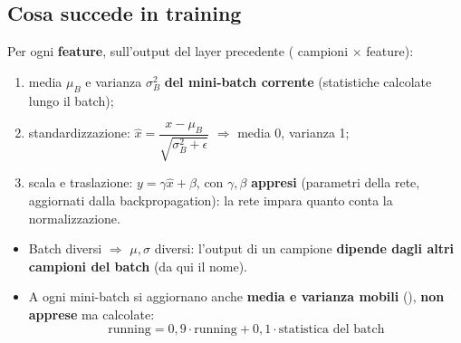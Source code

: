 \subsection{Cosa succede in training}
Per ogni \textbf{feature}, sull'output del layer precedente ( campioni $\times$  feature):
\begin{enumerate}
  \item media $\mu_B$ e varianza $\sigma^2_B$ \textbf{del mini-batch corrente} (statistiche calcolate lungo il batch);
  \item standardizzazione: $\hat x = \dfrac{x-\mu_B}{\sqrt{\sigma^2_B+\epsilon}}$ $\Rightarrow$ media 0, varianza 1;
  \item scala e traslazione: $y = \gamma\hat x + \beta$, con $\gamma, \beta$ \textbf{appresi} (parametri della rete, aggiornati dalla
        backpropagation): la rete impara quanto conta la normalizzazione.
\end{enumerate}
\begin{itemize}
  \item Batch diversi $\Rightarrow$ $\mu, \sigma$ diversi: l'output di un campione \textbf{dipende dagli altri campioni del batch}
        (da qui il nome).
  \item A ogni mini-batch si aggiornano anche \textbf{media e varianza mobili} (), \textbf{non apprese} ma calcolate:
        \[ \text{running} = 0{,}9\cdot\text{running} + 0{,}1\cdot\text{statistica del batch} \]
\end{itemize}

